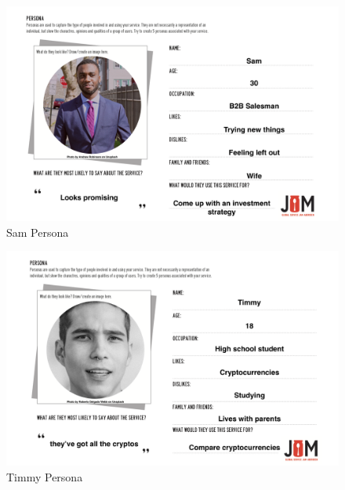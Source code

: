 \documentclass[main.tex]{subfiles}
\begin{document}
 \begin{figure}[H]
    \centering
    \includegraphics[width=1.1\textwidth,height=0.8\textheight]{08Appendices/084Background/Sam_per.png}
    \caption{Sam Persona}
 \end{figure}

 \begin{figure}[H]
    \centering
    \includegraphics[width=1.1\textwidth,height=0.8\textheight]{08Appendices/084Background/Timmy_per.png}
    \caption{Timmy Persona}
 \end{figure}
\end{document}
